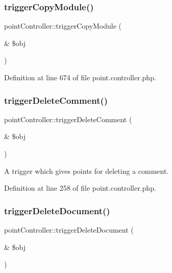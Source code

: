 \hypertarget{classpointController_a5d9adb9225985cfaf8b968f1b1a95bc5}{}\label{classpointController_a5d9adb9225985cfaf8b968f1b1a95bc5} 
\subsubsection{\texorpdfstring{trigger\+Copy\+Module()}{triggerCopyModule()}}
{\footnotesize\ttfamily point\+Controller\+::trigger\+Copy\+Module (\begin{DoxyParamCaption}\item[{\&}]{\$obj }\end{DoxyParamCaption})}



Definition at line 674 of file point.\+controller.\+php.

\hypertarget{classpointController_ac6e1679b70da98f95a3a6cfe190a96f2}{}\label{classpointController_ac6e1679b70da98f95a3a6cfe190a96f2} 
\subsubsection{\texorpdfstring{trigger\+Delete\+Comment()}{triggerDeleteComment()}}
{\footnotesize\ttfamily point\+Controller\+::trigger\+Delete\+Comment (\begin{DoxyParamCaption}\item[{\&}]{\$obj }\end{DoxyParamCaption})}



A trigger which gives points for deleting a comment. 



Definition at line 258 of file point.\+controller.\+php.

\hypertarget{classpointController_a12526b69a68224eccbb3816e8724e4a4}{}\label{classpointController_a12526b69a68224eccbb3816e8724e4a4} 
\subsubsection{\texorpdfstring{trigger\+Delete\+Document()}{triggerDeleteDocument()}}
{\footnotesize\ttfamily point\+Controller\+::trigger\+Delete\+Document (\begin{DoxyParamCaption}\item[{\&}]{\$obj }\end{DoxyParamCaption})}



